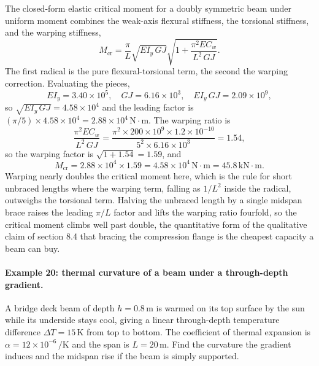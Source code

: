 The closed-form elastic critical moment for a doubly symmetric beam under
uniform moment combines the weak-axis flexural stiffness, the torsional
stiffness, and the warping stiffness,
\[
M_{\text{cr}} = \frac{\pi}{L}\sqrt{E I_y\,G J}
\sqrt{1 + \frac{\pi^2 E C_w}{L^2\,G J}}.
\]
The first radical is the pure flexural-torsional term, the second the
warping correction. Evaluating the pieces,
\[
E I_y = 3.40 \times 10^{5}, \quad G J = 6.16 \times 10^{3}, \quad
E I_y\,G J = 2.09 \times 10^{9},
\]
so $\sqrt{E I_y\,G J} = 4.58 \times 10^{4}$ and the leading factor is
$(\pi/5)\times 4.58\times 10^4 = 2.88\times 10^4\,\text{N}\cdot\text{m}$.
The warping ratio is
\[
\frac{\pi^2 E C_w}{L^2\,G J}
= \frac{\pi^2 \times 200 \times 10^9 \times 1.2 \times 10^{-10}}
{5^2 \times 6.16 \times 10^3} = 1.54,
\]
so the warping factor is $\sqrt{1 + 1.54} = 1.59$, and
\[
M_{\text{cr}} = 2.88 \times 10^4 \times 1.59 = 4.58 \times 10^4\,\text{N}
\cdot\text{m} = 45.8\,\text{kN}\cdot\text{m}.
\]
Warping nearly doubles the critical moment here, which is the rule for
short unbraced lengths where the warping term, falling as $1/L^2$ inside
the radical, outweighs the torsional term. Halving the unbraced length by
a single midspan brace raises the leading $\pi/L$ factor and lifts the
warping ratio fourfold, so the critical moment climbs well past double, the
quantitative form of the qualitative claim of section 8.4 that bracing the
compression flange is the cheapest capacity a beam can buy.

\paragraph{Example 20: thermal curvature of a beam under a through-depth
gradient.} A bridge deck beam of depth $h = 0.8\,\si{\meter}$ is warmed on
its top surface by the sun while its underside stays cool, giving a linear
through-depth temperature difference $\Delta T = 15\,\si{\kelvin}$ from top
to bottom. The coefficient of thermal expansion is $\alpha = 12 \times
10^{-6}\,\si{\per\kelvin}$ and the span is $L = 20\,\si{\meter}$. Find the
curvature the gradient induces and the midspan rise if the beam is simply
supported.

